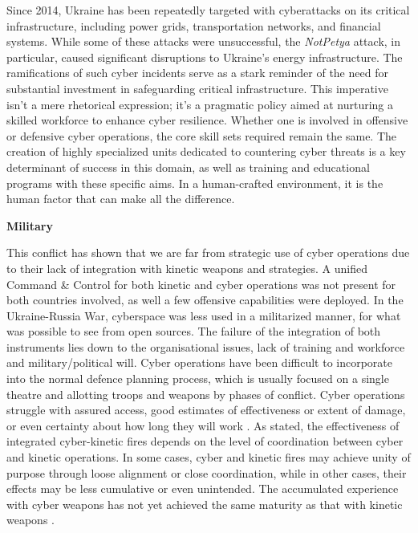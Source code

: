 Since 2014, Ukraine has been repeatedly targeted with cyberattacks on its critical infrastructure, including power grids, transportation networks, and financial systems. While some of these attacks were unsuccessful, the \textit{NotPetya} attack, in particular, caused significant disruptions to Ukraine's energy infrastructure. The ramifications of such cyber incidents serve as a stark reminder of the need for substantial investment in safeguarding critical infrastructure. This imperative isn't a mere rhetorical expression; it's a pragmatic policy aimed at nurturing a skilled workforce to enhance cyber resilience. Whether one is involved in offensive or defensive cyber operations, the core skill sets required remain the same. The creation of highly specialized units dedicated to countering cyber threats is a key determinant of success in this domain, as well as training and educational programs with these specific aims. In a human-crafted environment, it is the human factor that can make all the difference.

\textbf{Military}

This conflict has shown that we are far from strategic use of cyber operations due to their lack of integration with kinetic weapons and strategies. A unified Command \& Control for both kinetic and cyber operations was not present for both countries involved, as well a few offensive capabilities were deployed. In the Ukraine-Russia War, cyberspace was less used in a militarized manner, for what was possible to see from open sources. The failure of the integration of both instruments lies down to the organisational issues, lack of training and workforce and military/political will.  Cyber operations have been difficult to incorporate into the normal defence planning process, which is usually focused on a single theatre and allotting troops and weapons by phases of conflict. Cyber operations struggle with assured access, good estimates of effectiveness or extent of damage, or even certainty about how long they will work \autocite{lonergan_2021_cyber}. As \textcite{baetman_2022_russias} stated, the effectiveness of integrated cyber-kinetic fires depends on the level of coordination between cyber and kinetic operations. In some cases, cyber and kinetic fires may achieve unity of purpose through loose alignment or close coordination, while in other cases, their effects may be less cumulative or even unintended. The accumulated experience with cyber weapons has not yet achieved the same maturity as that with kinetic weapons \autocite{dykstra_2020_differentiating}. 



